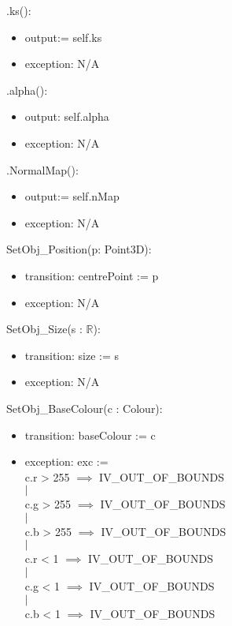 \documentclass[12pt, titlepage]{article}
\begin{document}
\noindent .ks():
\begin{itemize}
	\item output:= self.ks
	\item exception: N/A
\end{itemize}

\noindent .alpha():
\begin{itemize}
	\item output: self.alpha
	\item exception: N/A
\end{itemize}

\noindent .NormalMap():
\begin{itemize}
	\item output:= self.nMap
	\item exception: N/A
\end{itemize}
\noindent SetObj\_Position(p: Point3D):
\begin{itemize}
	\item transition: centrePoint := p
	\item exception: N/A
\end{itemize}

\noindent SetObj\_Size(s : $\mathbb{R}$):
\begin{itemize}
	\item transition: size := s
	\item exception: N/A
\end{itemize}

\noindent SetObj\_BaseColour(c : Colour):
\begin{itemize}
	\item transition: baseColour := c
	\item exception: exc := {\\
					c.r > 255 $\implies$ IV\_OUT\_OF\_BOUNDS\\
					$|$ \\
					c.g > 255 $\implies$ IV\_OUT\_OF\_BOUNDS \\
					$|$ \\
					c.b > 255 $\implies$ IV\_OUT\_OF\_BOUNDS\\
					$|$ \\
					c.r < 1 $\implies$ IV\_OUT\_OF\_BOUNDS\\
					$|$ \\
					c.g < 1 $\implies$ IV\_OUT\_OF\_BOUNDS \\
					$|$ \\
					c.b < 1 $\implies$ IV\_OUT\_OF\_BOUNDS}	\\	
\end{itemize}
\end{document}
